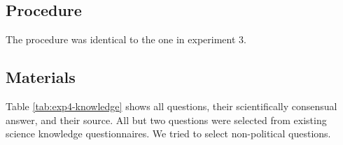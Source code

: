 \documentclass[
  doc,floatsintext]{apa6}
\begin{document}
\subsection{Procedure}\label{procedure-3}

The procedure was identical to the one in experiment 3.

\subsection{Materials}\label{materials-5}

\FloatBarrier

Table \ref{tab:exp4-knowledge} shows all questions, their scientifically consensual answer, and their source. All but two questions were selected from existing science knowledge questionnaires. We tried to select non-political questions.

\begingroup\fontsize{8}{10}\selectfont
\end{document}
